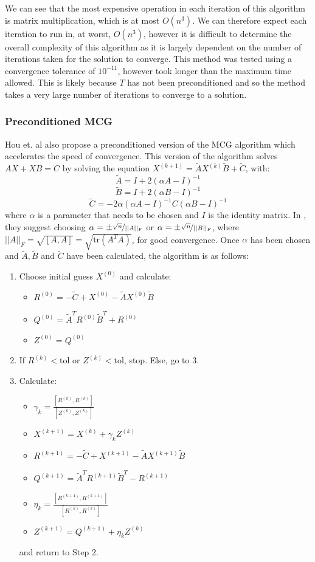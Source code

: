 \documentclass[11pt]{article}
\numberwithin{equation}{section}
\begin{document}
We can see that the most expensive operation in each iteration of this algorithm is matrix multiplication, which is at most $O(n^3)$. We can therefore expect each iteration to run in, at worst, $O(n^3)$, however it is difficult to determine the overall complexity of this algorithm as it is largely dependent on the number of iterations taken for the solution to converge. This method was tested using a convergence tolerance of $10^{-11}$, however took longer than the maximum time allowed. This is likely because $T$ has not been preconditioned and so the method takes a very large number of iterations to converge to a solution.

\subsubsection{Preconditioned MCG}
Hou et. al \cite{Hou} also propose a preconditioned version of the MCG algorithm which accelerates the speed of convergence. This version of the algorithm solves $AX + XB = C$ by solving the equation 
$X^{(k+1)} = \widetilde{A}X^{(k)} \widetilde{B} + \widetilde{C}$, with:
\[ \widetilde{A} = I + 2(\alpha A - I)^{-1} \]
\[ \widetilde{B} = I + 2(\alpha B - I)^{-1} \]
\[ \widetilde{C} = -2\alpha(\alpha A - I)^{-1} C (\alpha B - I)^{-1} \]
where $\alpha$ is a parameter that needs to be chosen and $I$ is the identity matrix. In \cite{Hou}, they suggest choosing $\alpha = \pm \nicefrac{\sqrt{n}}{||A||_F}$ or $\alpha = \pm \nicefrac{\sqrt{n}}{||B||_F}$, where $||A||_F = \sqrt{[A,A]} = \sqrt{\text{tr}(A^TA)}$, for good convergence. Once $\alpha$ has been chosen and $\widetilde{A}, \widetilde{B}$ and $\widetilde{C}$ have been calculated, the algorithm is as follows:
\begin{enumerate}
\item Choose initial guess $X^{(0)}$ and calculate:
	\begin{itemize}
	\item $R^{(0)} = -\widetilde{C} + X^{(0)} - \widetilde{A}X^{(0)} \widetilde{B}$
	\item $Q^{(0)} = \widetilde{A}^T R^{(0)}\widetilde{B}^T + R^{(0)}$
	\item $Z^{(0)} = Q^{(0)}$
	\end{itemize}
\item If $R^{(k)} < \text{tol}$ or $Z^{(k)} < \text{tol}$, stop. Else, go to 3.
\item Calculate:
	\begin{itemize}
	\item $ \gamma_k = \frac{[R^{(k)}, R^{(k)}]}{[Z^{(k)}, Z^{(k)}]}$
	\item $X^{(k+1)} = X^{(k)} + \gamma_k Z^{(k)} $
	\item $R^{(k+1)} = -\widetilde{C} + X^{(k+1)} - \widetilde{A}X^{(k+1)} \widetilde{B}$
	\item $Q^{(k+1)} = \widetilde{A}^T R^{(k+1)}\widetilde{B}^T - R^{(k+1)}$
	\item $\eta_k = \frac{[R^{(k+1)}, R^{(k+1)}]}{[R^{(k)}, R^{(k)}]}$ 
	\item $Z^{(k+1)} = Q^{(k+1)} + \eta_k Z^{(k)}$
	\end{itemize}
	and return to Step 2.
\end{enumerate}
\end{document}
